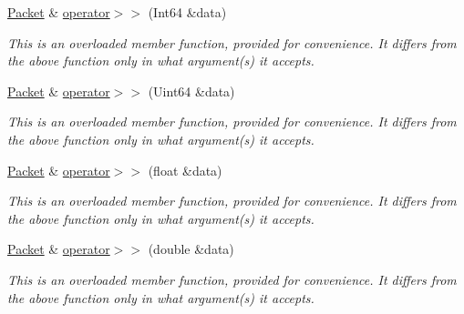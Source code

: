 \begin{DoxyCompactItemize}
\mbox{\label{classsf_1_1_packet_a8409de6477e17ca48225a835451261c1}} 
\mbox{\hyperlink{classsf_1_1_packet}{Packet}} \& \mbox{\hyperlink{classsf_1_1_packet_a8409de6477e17ca48225a835451261c1}{operator$>$$>$}} (Int64 \&data)
\begin{DoxyCompactList}\small\item\em This is an overloaded member function, provided for convenience. It differs from the above function only in what argument(s) it accepts. \end{DoxyCompactList}\item 
\mbox{\label{classsf_1_1_packet_a8fa9c970062753b03e43db4999fc7743}} 
\mbox{\hyperlink{classsf_1_1_packet}{Packet}} \& \mbox{\hyperlink{classsf_1_1_packet_a8fa9c970062753b03e43db4999fc7743}{operator$>$$>$}} (Uint64 \&data)
\begin{DoxyCompactList}\small\item\em This is an overloaded member function, provided for convenience. It differs from the above function only in what argument(s) it accepts. \end{DoxyCompactList}\item 
\mbox{\label{classsf_1_1_packet_a6704b4d13d6f798efe6fa836a8b5fa24}} 
\mbox{\hyperlink{classsf_1_1_packet}{Packet}} \& \mbox{\hyperlink{classsf_1_1_packet_a6704b4d13d6f798efe6fa836a8b5fa24}{operator$>$$>$}} (float \&data)
\begin{DoxyCompactList}\small\item\em This is an overloaded member function, provided for convenience. It differs from the above function only in what argument(s) it accepts. \end{DoxyCompactList}\item 
\mbox{\label{classsf_1_1_packet_ac84239a8ba0a165394805c17b35a88cf}} 
\mbox{\hyperlink{classsf_1_1_packet}{Packet}} \& \mbox{\hyperlink{classsf_1_1_packet_ac84239a8ba0a165394805c17b35a88cf}{operator$>$$>$}} (double \&data)
\begin{DoxyCompactList}\small\item\em This is an overloaded member function, provided for convenience. It differs from the above function only in what argument(s) it accepts. \end{DoxyCompactList}\item 

\end{DoxyCompactItemize}
